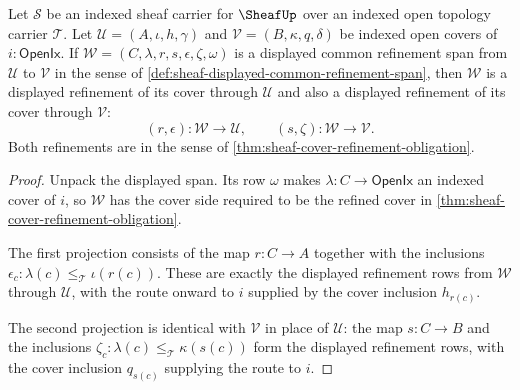 \begin{theorem}
\label{thm:sheaf-displayed-common-refinement-span}
Let $\mathcal{S}$ be an indexed sheaf carrier for $\SheafUp$ over an indexed open topology carrier $\mathcal{T}$. Let $\mathcal{U}=(A,\iota,h,\gamma)$ and $\mathcal{V}=(B,\kappa,q,\delta)$ be indexed open covers of $i:\mathsf{OpenIx}$. If $\mathcal{W}=(C,\lambda,r,s,\epsilon,\zeta,\omega)$ is a displayed common refinement span from $\mathcal{U}$ to $\mathcal{V}$ in the sense of \autoref{def:sheaf-displayed-common-refinement-span}, then $\mathcal{W}$ is a displayed refinement of its cover through $\mathcal{U}$ and also a displayed refinement of its cover through $\mathcal{V}$:
$$
(r,\epsilon):\mathcal{W}\to\mathcal{U},
\qquad
(s,\zeta):\mathcal{W}\to\mathcal{V}.
$$
Both refinements are in the sense of \autoref{thm:sheaf-cover-refinement-obligation}.
\end{theorem}
\begin{proof}
Unpack the displayed span. Its row $\omega$ makes $\lambda:C\to\mathsf{OpenIx}$ an indexed cover of $i$, so $\mathcal{W}$ has the cover side required to be the refined cover in \autoref{thm:sheaf-cover-refinement-obligation}.

The first projection consists of the map $r:C\to A$ together with the inclusions $\epsilon_c:\lambda(c)\le_{\mathcal{T}}\iota(r(c))$. These are exactly the displayed refinement rows from $\mathcal{W}$ through $\mathcal{U}$, with the route onward to $i$ supplied by the cover inclusion $h_{r(c)}$.

The second projection is identical with $\mathcal{V}$ in place of $\mathcal{U}$: the map $s:C\to B$ and the inclusions $\zeta_c:\lambda(c)\le_{\mathcal{T}}\kappa(s(c))$ form the displayed refinement rows, with the cover inclusion $q_{s(c)}$ supplying the route to $i$.
\end{proof}

